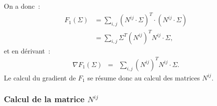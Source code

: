 On a donc~: 
\begin{align*}
F_1(\Sigma) &= \sum\limits_{i,j}(N^{ij}\cdot \Sigma)^T \cdot 
(N^{ij}\cdot \Sigma)\\
&=  \sum\limits_{i,j}\Sigma^T(N^{ij})^T N^{ij}\cdot \Sigma,
\end{align*}
et en d\'erivant~: 
\begin{eqnarray}
\nabla F_1(\Sigma) &=& \sum\limits_{i,j}(N^{ij})^T N^{ij}\cdot 
\Sigma. 
\label{grad_F1}
\end{eqnarray} 
Le calcul du gradient de $F_1$ se r\'esume donc au calcul des 
matrices $N^{ij}$.

\subsubsection*{Calcul de la matrice $N^{ij}$}

